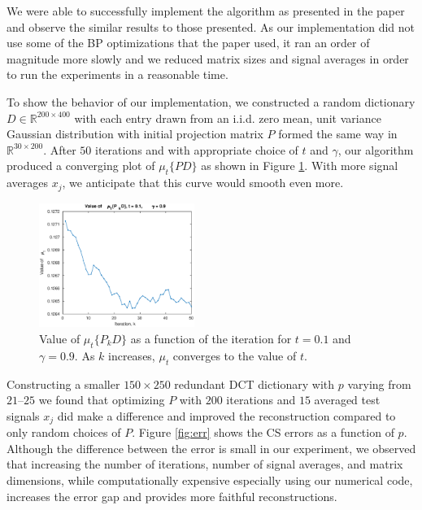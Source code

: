 \documentclass[journal]{IEEEtran}
\begin{document}
We were able to successfully implement the algorithm as presented in the paper and observe the similar results to those presented.  As our implementation did not use some of the BP optimizations that the paper used, it ran an order of magnitude more slowly and we reduced matrix sizes and signal averages in order to run the experiments in a reasonable time.

To show the behavior of our implementation, we constructed a random dictionary $D \in \mathbb{R}^{200 \times 400} $ with each entry drawn from an i.i.d. zero mean, unit variance Gaussian distribution with initial projection matrix $P$ formed the same way in $\mathbb{R}^{30 \times 200}$.  After $50$ iterations and with appropriate choice of $t$ and $\gamma$, our algorithm produced a converging plot of $\mu_t\{PD\}$ as shown in Figure \ref{fig:mu_t}.  With more signal averages $x_j$, we anticipate that this curve would smooth even more.

\begin{figure}[]
  \centering
  \includegraphics[width=0.45\textwidth]{mu_t.eps}
  \caption{Value of $\mu_t\{P_kD\}$ as a function of the iteration for $t = 0.1$ and $\gamma = 0.9$.  As $k$ increases, $\mu_t$ converges to the value of $t$.}
  \label{fig:mu_t}
\end{figure}

Constructing a smaller $150 \times 250$ redundant DCT dictionary with $p$ varying from $21$--$25$ we found that optimizing $P$ with $200$ iterations and $15$ averaged test signals $x_j$ did make a difference and improved the reconstruction compared to only random choices of $P$.  Figure \ref{fig:err} shows the CS errors as a function of $p$.  Although the difference between the error is small in our experiment, we observed that increasing the number of iterations, number of signal averages, and matrix dimensions, while computationally expensive especially using our numerical code, increases the error gap and provides more faithful reconstructions.
\end{document}
